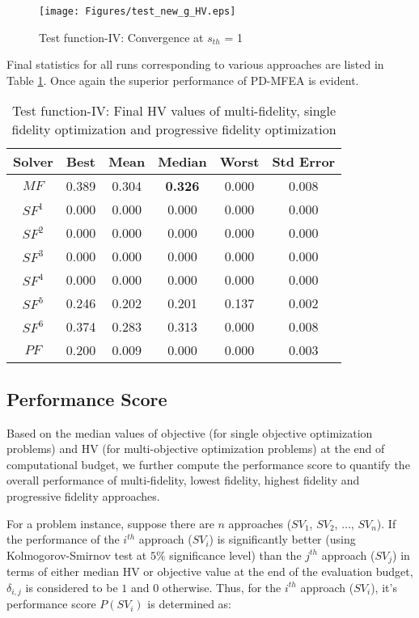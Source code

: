 \begin{figure}[ht]
	\centering
	\texttt{[image: Figures/test\_new\_g\_HV.eps]}
	\caption{Test function-IV: Convergence at $s_{th}$ = 1}
	\label{fig:Meanplot_test_new_g_1sigma}
\end{figure}

Final statistics for all runs corresponding to various approaches are listed in Table \ref{tab:testfunc4hvstat}. Once again the superior performance of PD-MFEA is evident. 

\begin{table}[!htb]\footnotesize
	\centering
	\caption{Test function-IV: Final HV values of multi-fidelity, single fidelity optimization and progressive fidelity optimization}
	\label{tab:testfunc4hvstat}
	\begin{tabular}{|c|c|c|c|c|c|}
		\noalign{\smallskip}\hline
		Solver& Best &Mean & Median & Worst & Std Error\\ \hline
		$MF$&0.389&0.304&\textbf{0.326}&0.000&0.008\\ \hline
		$SF^1$&0.000&0.000&0.000&0.000&0.000\\ \hline
		$SF^2$&0.000&0.000&0.000&0.000&0.000\\ \hline
		$SF^3$&0.000&0.000&0.000&0.000&0.000\\ \hline
		$SF^4$&0.000&0.000&0.000&0.000&0.000\\ \hline
		$SF^5$&0.246&0.202&0.201&0.137&0.002\\ \hline
		$SF^6$&0.374&0.283&0.313&0.000&0.008\\ \hline
		$PF$&0.200&0.009&0.000&0.000&0.003\\ 
		\hline
	\end{tabular}
\end{table}

\subsection{Performance Score}

Based on the median values of objective (for single objective optimization problems) and HV (for multi-objective optimization problems) at the end of computational budget, we further compute the performance score \cite{bader2011hype} to quantify the overall performance of multi-fidelity, lowest fidelity, highest fidelity and progressive fidelity approaches. 

For a problem instance, suppose there are $n$ approaches ($SV_1$, $SV_2$, $\ldots$, $SV_n$). If the performance of the $i^{th}$ approach ($SV_i$) is significantly better (using Kolmogorov-Smirnov test at $5\%$ significance level) than the $j^{th}$ approach ($SV_j$) in terms of either median HV or objective value at the end of the evaluation budget, $\delta_{i,j}$ is considered to be $1$ and $0$ otherwise. Thus, for the $i^{th}$ approach ($SV_i$), it's performance score $P(SV_i)$ is determined as:\\

